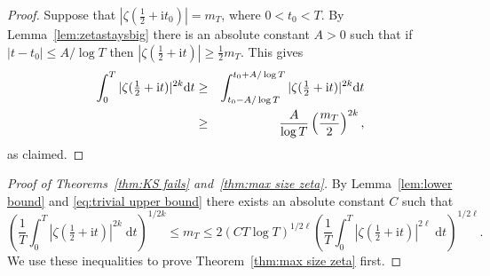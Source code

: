 \documentclass[10pt,reqno,twoside]{amsart}
\renewcommand{\d}{{\mathrm{d}}} %
\renewcommand{\i}{{\mathrm{i}}} %
\numberwithin{equation}{section}
\numberwithin{theorem}{section}
\begin{document}
{{\begin{proof}

Suppose that  $|\zeta(\frac12+\i t_0)|=m_T$, where $0<t_0<T$.
By Lemma~\ref{lem:zetastaysbig}
there is an absolute constant $A>0$ such that if $|t - t_0|\le
A/\log T$ then $|\zeta(\frac12+\i t)| \ge \frac12 m_T$. This gives
\begin{eqnarray}
\int_0^T |\zeta(\tfrac12+\i t)|^{2k} \d t
&\ge &
\int_{t_0-A/\log T}^{t_0+A/\log T} |\zeta(\tfrac12+\i t)|^{2k} \d t \cr
&\ge &
\frac{A}{\log T} \left(\frac{m_T }{2}\right)^{2k} ,
\end{eqnarray}
as claimed.
\end{proof}


\begin{proof}[Proof of Theorems~\ref{thm:KS fails} and~\ref{thm:max size zeta}]
By Lemma~\ref{lem:lower bound} and \eqref{eq:trivial upper bound}
there exists an absolute constant $C$ such that
\begin{equation}
\label{eqn:doubleinequality}
\left(\frac{1}{T} \int_0^T |\zeta(\tfrac12+\i t)|^{2k} \;\d
t\right)^{1/2k} \leq m_T \leq
2(CT \log T)^{1/2\ell}  \left(\frac{1}{T} \int_0^T
|\zeta(\tfrac12+\i t)|^{2\ell} \;\d t \right)^{1/2\ell} .
\end{equation}
We use these inequalities to prove Theorem~\ref{thm:max size zeta} first.


\end{proof}}}
\end{document}
